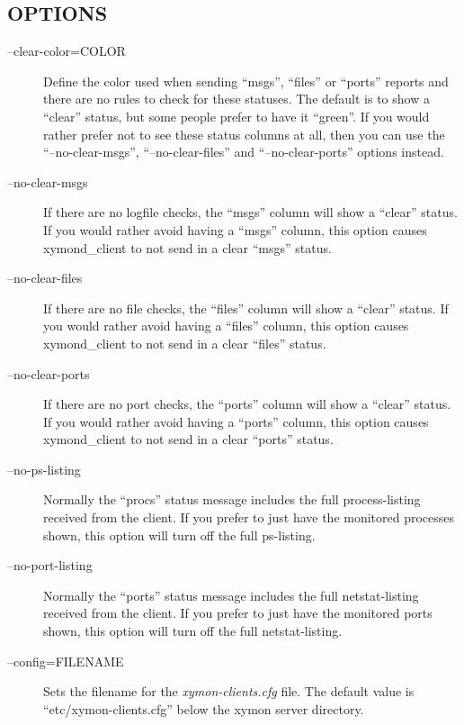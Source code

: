 \subsection{OPTIONS}
\begin{description}
\item[--clear-color=COLOR] Define the color used when sending ``msgs'', ``files'' or ``ports'' reports and there are no rules to check for these statuses. The default is to show a ``clear'' status, but some people prefer to have it ``green''. If you would rather prefer not to see these status columns at all, then you can use the ``--no-clear-msgs'', ``--no-clear-files'' and ``--no-clear-ports'' options instead. 

 

\item[--no-clear-msgs] If there are no logfile checks, the ``msgs'' column will show a ``clear'' status. If you would rather avoid having a ``msgs'' column, this option causes xymond\_client to not send in a clear ``msgs'' status. 

 

\item[--no-clear-files] If there are no file checks, the ``files'' column will show a ``clear'' status. If you would rather avoid having a ``files'' column, this option causes xymond\_client to not send in a clear ``files'' status. 

 

\item[--no-clear-ports] If there are no port checks, the ``ports'' column will show a ``clear'' status. If you would rather avoid having a ``ports'' column, this option causes xymond\_client to not send in a clear ``ports'' status. 

 

\item[--no-ps-listing] Normally the ``procs'' status message includes the full process-listing received from the client. If you prefer to just have the monitored processes shown, this option will turn off the full ps-listing. 

 

\item[--no-port-listing] Normally the ``ports'' status message includes the full netstat-listing received from the client. If you prefer to just have the monitored ports shown, this option will turn off the full netstat-listing. 

 

\item[--config=FILENAME] Sets the filename for the \emph{xymon-clients.cfg}
 file. The default value is ``etc/xymon-clients.cfg'' below the xymon server directory. 


\end{description}

